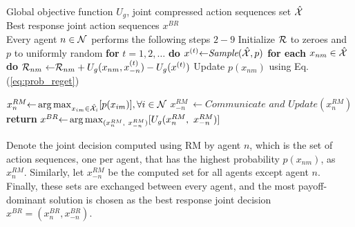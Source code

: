 \begin{algorithm}[!t]
 \caption{ \footnotesize Regret Matching Coordination algorithm \normalsize } %
 \label{alg:RM}
 \begin{algorithmic}[1]
 \renewcommand{\algorithmicrequire}
{\textbf{Input:}}
 \REQUIRE Global objective function $U_g$, joint compressed action sequences set $\hat{\mathcal{X}}$\\
 \renewcommand{\algorithmicrequire}{\textbf{Output:}}
 \REQUIRE Best response joint action sequences $x^{BR}$\\
 \STATE Every agent $n\in \mathcal{N}$ performs the following steps $2-9$ 
 \STATE \quad Initialize $\mathcal{R}$ to zeroes and $p$ to uniformly random
 \STATE \quad \textbf{for} $t=1,2, \dots$ \textbf{do}
 \STATE \quad \quad $x^{(t)} {\leftarrow} \textit{Sample} (\hat{\mathcal{X}}, p)$
 \STATE \quad \quad \textbf{for each} $x_{nm} \in \hat{\mathcal{X}}$ \textbf{do}
 \STATE \quad \quad \quad $\mathcal{R}_{nm}\ {\leftarrow} \mathcal{R}_{nm} + U_g(x_{nm}, x^{(t)}_{-n}) -  U_g(x^{(t)})$ 
 \STATE \quad \quad \quad Update $p(x_{nm})$ using Eq. (\ref{eq:prob_reget})

 \STATE \quad $x^{RM}_n {\leftarrow} \operatorname*{arg\,max}_{x_{im} \in \hat{\mathcal{X}_i}} [p(x_{im})], \forall i \in \mathcal{N}$
 \STATE \quad $x^{RM}_{-n}\ {\leftarrow} \textit{Communicate and Update} (x^{RM}_n)$
 \STATE \textbf{return} $x^{BR} {\leftarrow} \argmax_{(x^{RM}_n,\ x^{RM}_{-n})} [U_g(x^{RM}_n,\ x^{RM}_{-n})]$
 \end{algorithmic}
\end{algorithm}

Denote the joint decision computed using RM by agent $n$, which is the set of action sequences, one per agent, that has the highest probability $p(x_{nm})$, as $x^{RM}_n$. Similarly, let $x^{RM}_{-n}$ be the computed set for all agents except agent $n$. Finally, these sets are exchanged between every agent, and the most payoff-dominant solution is chosen as the best response joint decision $x^{BR}=(x^{BR}_n,x^{BR}_{-n})$.

